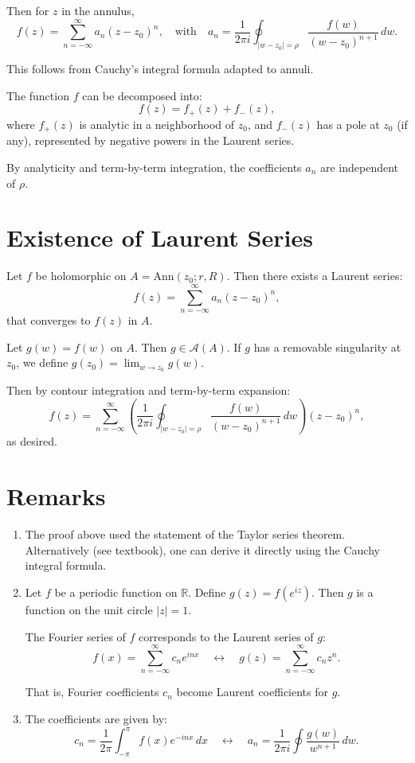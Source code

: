 \documentclass[12pt]{article}
\theoremstyle{definition} %
\theoremstyle{plain} %
\begin{document}
Then for $z$ in the annulus,
\[
f(z) = \sum_{n=-\infty}^\infty a_n (z - z_0)^n, \quad \text{with} \quad a_n = \frac{1}{2\pi i} \oint_{|w - z_0| = \rho} \frac{f(w)}{(w - z_0)^{n+1}} \, dw.
\]

This follows from Cauchy's integral formula adapted to annuli.

The function $f$ can be decomposed into:
\[
f(z) = f_+(z) + f_-(z),
\]
where $f_+(z)$ is analytic in a neighborhood of $z_0$, and $f_-(z)$ has a pole at $z_0$ (if any), represented by negative powers in the Laurent series.

By analyticity and term-by-term integration, the coefficients $a_n$ are independent of $\rho$.

\section*{Existence of Laurent Series}

Let $f$ be holomorphic on $A = \text{Ann}(z_0; r, R)$. Then there exists a Laurent series:
\[
f(z) = \sum_{n=-\infty}^\infty a_n (z - z_0)^n,
\]
that converges to $f(z)$ in $A$.

Let $g(w) = f(w)$ on $A$. Then $g \in \mathcal{A}(A)$. If $g$ has a removable singularity at $z_0$, we define $g(z_0) = \lim_{w \to z_0} g(w)$.

Then by contour integration and term-by-term expansion:
\[
f(z) = \sum_{n=-\infty}^{\infty} \left( \frac{1}{2\pi i} \oint_{|w - z_0| = \rho} \frac{f(w)}{(w - z_0)^{n+1}} \, dw \right) (z - z_0)^n,
\]
as desired.

\section*{Remarks}

\begin{enumerate}
    \item The proof above used the statement of the Taylor series theorem. Alternatively (see textbook), one can derive it directly using the Cauchy integral formula.

    \item Let $f$ be a periodic function on $\mathbb{R}$. Define $g(z) = f(e^{iz})$. Then $g$ is a function on the unit circle $|z| = 1$.

    The Fourier series of $f$ corresponds to the Laurent series of $g$:
    \[
    f(x) = \sum_{n=-\infty}^\infty c_n e^{inx} \quad \leftrightarrow \quad g(z) = \sum_{n=-\infty}^\infty c_n z^n.
    \]

    That is, Fourier coefficients $c_n$ become Laurent coefficients for $g$.

    \item The coefficients are given by:
    \[
    c_n = \frac{1}{2\pi} \int_{-\pi}^\pi f(x) e^{-inx} \, dx \quad \leftrightarrow \quad a_n = \frac{1}{2\pi i} \oint \frac{g(w)}{w^{n+1}} \, dw.
    \]
\end{enumerate}
\end{document}
